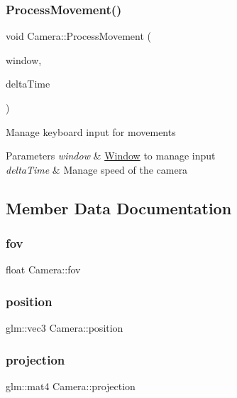 \subsubsection{\texorpdfstring{Process\+Movement()}{ProcessMovement()}}
{\footnotesize\ttfamily void Camera\+::\+Process\+Movement (\begin{DoxyParamCaption}\item[{G\+L\+F\+Wwindow $\ast$}]{window,  }\item[{float}]{delta\+Time }\end{DoxyParamCaption})}



Manage keyboard input for movements 


\begin{DoxyParams}{Parameters}
{\em window} & \mbox{\hyperlink{class_window}{Window}} to manage input\\
\hline
{\em delta\+Time} & Manage speed of the camera\\
\hline
\end{DoxyParams}


\subsection{Member Data Documentation}
\mbox{\label{class_camera_aff7393c9cfbccd7e369091f00008da93}} 
\subsubsection{\texorpdfstring{fov}{fov}}
{\footnotesize\ttfamily float Camera\+::fov}

\mbox{\label{class_camera_a04b5db2c530d8630660e8cfb93a4b3b5}} 
\subsubsection{\texorpdfstring{position}{position}}
{\footnotesize\ttfamily glm\+::vec3 Camera\+::position}

\mbox{\label{class_camera_a43555a0ae83f9ec696ee257e5fd48cf2}} 
\subsubsection{\texorpdfstring{projection}{projection}}
{\footnotesize\ttfamily glm\+::mat4 Camera\+::projection}

